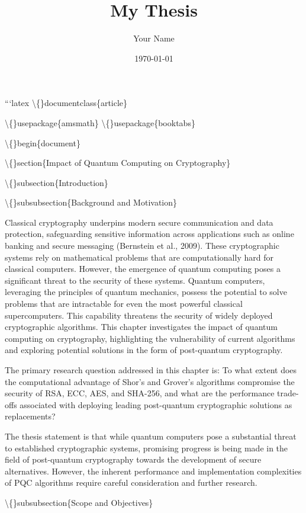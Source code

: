 \documentclass{article}
\title{My Thesis}
\author{Your Name}
\date{\today}
\begin{document}
\maketitle

```latex
\textbackslash\{\}documentclass\{article\}

\textbackslash\{\}usepackage\{amsmath\}
\textbackslash\{\}usepackage\{booktabs\}

\textbackslash\{\}begin\{document\}

\textbackslash\{\}section\{Impact of Quantum Computing on Cryptography\}

\textbackslash\{\}subsection\{Introduction\}

\textbackslash\{\}subsubsection\{Background and Motivation\}

Classical cryptography underpins modern secure communication and data protection, safeguarding sensitive information across applications such as online banking and secure messaging (Bernstein et al., 2009). These cryptographic systems rely on mathematical problems that are computationally hard for classical computers. However, the emergence of quantum computing poses a significant threat to the security of these systems. Quantum computers, leveraging the principles of quantum mechanics, possess the potential to solve problems that are intractable for even the most powerful classical supercomputers. This capability threatens the security of widely deployed cryptographic algorithms. This chapter investigates the impact of quantum computing on cryptography, highlighting the vulnerability of current algorithms and exploring potential solutions in the form of post-quantum cryptography.

The primary research question addressed in this chapter is: To what extent does the computational advantage of Shor's and Grover's algorithms compromise the security of RSA, ECC, AES, and SHA-256, and what are the performance trade-offs associated with deploying leading post-quantum cryptographic solutions as replacements?

The thesis statement is that while quantum computers pose a substantial threat to established cryptographic systems, promising progress is being made in the field of post-quantum cryptography towards the development of secure alternatives. However, the inherent performance and implementation complexities of PQC algorithms require careful consideration and further research.

\textbackslash\{\}subsubsection\{Scope and Objectives\}
\end{document}
